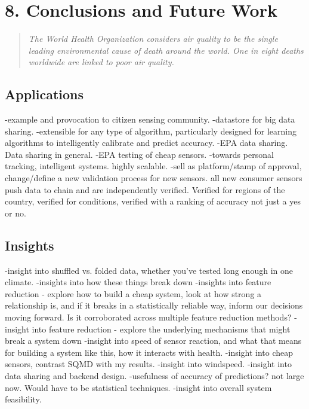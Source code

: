 \chapter{8. Conclusions and Future Work}

\begin{quote}
\textit{The World Health Organization considers air quality to be the single leading environmental cause of death around the world.  One in eight deaths worldwide are linked to poor air quality.} \newline
\end{quote}


\section{Applications}
-example and provocation to citizen sensing community.
-datastore for big data sharing.  
-extensible for any type of algorithm, particularly designed for learning algorithms to intelligently calibrate and predict accuracy.
-EPA data sharing.  Data sharing in general.
-EPA testing of cheap sensors.
-towards personal tracking, intelligent systems.  highly scalable.
-sell as platform/stamp of approval, change/define a new validation process for new sensors.  all new consumer sensors push data to chain and are independently verified.  Verified for regions of the country, verified for conditions, verified with a ranking of accuracy not just a yes or no.


\section{Insights}

-insight into shuffled vs. folded data, whether you've tested long enough in one climate.
-insights into how these things break down
-insights into feature reduction - explore how to build a cheap system, look at how strong a relationship is, and if it breaks in a statistically reliable way, inform our decisions moving forward.  Is it corroborated across multiple feature reduction methods?
-insight into feature reduction - explore the underlying mechanisms that might break a system down 
-insight into speed of sensor reaction, and what that means for building a system like this, how it interacts with health.
-insight into cheap sensors, contrast SQMD with my results.
-insight into windspeed.
-insight into data sharing and backend design.
-usefulness of accuracy of predictions?  not large now.  Would have to be statistical techniques.
-insight into overall system feasibility.


